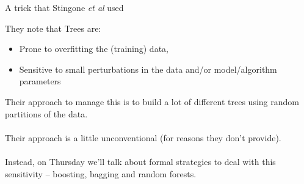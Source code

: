 \documentclass[mathserif, aspectratio=169]{beamer}
\begin{document}
\begin{frame}{A trick that Stingone \textit{et al }used}

They note that Trees are: 
\begin{itemize}
\item Prone to overfitting the (training) data, 
\item Sensitive to small perturbations in the data and/or model/algorithm parameters
\end{itemize}

Their approach to manage this is to build a lot of different trees using random partitions of the data.  \\~\\
Their approach is a little unconventional (for  reasons they don't provide).\\~\\

Instead, on Thursday we'll talk about formal strategies to deal with this sensitivity -- boosting, bagging and random forests.  

\end{frame}
\end{document}
